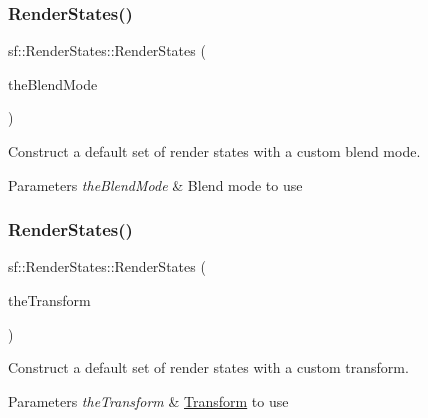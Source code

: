 \subsubsection{\texorpdfstring{Render\+States()}{RenderStates()}\hspace{0.1cm}{\footnotesize\ttfamily [2/6]}}
{\footnotesize\ttfamily sf\+::\+Render\+States\+::\+Render\+States (\begin{DoxyParamCaption}\item[{const \hyperlink{structsf_1_1_blend_mode}{Blend\+Mode} \&}]{the\+Blend\+Mode }\end{DoxyParamCaption})}



Construct a default set of render states with a custom blend mode. 


\begin{DoxyParams}{Parameters}
{\em the\+Blend\+Mode} & Blend mode to use \\
\hline
\end{DoxyParams}
\mbox{\label{classsf_1_1_render_states_a3e99cad6ab05971d40357949930ed890}} 
\subsubsection{\texorpdfstring{Render\+States()}{RenderStates()}\hspace{0.1cm}{\footnotesize\ttfamily [3/6]}}
{\footnotesize\ttfamily sf\+::\+Render\+States\+::\+Render\+States (\begin{DoxyParamCaption}\item[{const \hyperlink{classsf_1_1_transform}{Transform} \&}]{the\+Transform }\end{DoxyParamCaption})}



Construct a default set of render states with a custom transform. 


\begin{DoxyParams}{Parameters}
{\em the\+Transform} & \hyperlink{classsf_1_1_transform}{Transform} to use \\
\hline
\end{DoxyParams}
\mbox{\label{classsf_1_1_render_states_a8f4ca3be0e27dafea0c4ab8547439bb1}} 
